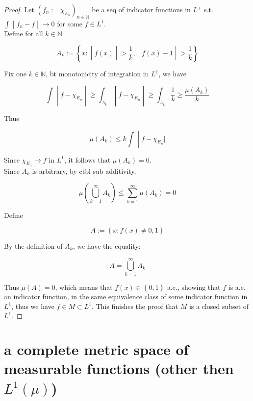 \begin{proof}

Let \((f_{n} := \chi_{E_{n}})_{n \in \mathbb{N}}\) be a seq of indicator functions in \(L^{+}\) s.t. \(\left. \int \middle| f_{n} - f \middle| \rightarrow 0 \right.\) for some \(f \in L^{1}\).\\
Define for all \(k \in \mathbb{N}\)

\[A_{k} := \left\{ x: \middle| f(x) \middle| > \frac{1}{k}, \middle| f(x) - 1 \middle| > \frac{1}{k} \right\}\]

Fix one \(k \in \mathbb{N}\), bt monotonicity of integration in \(L^{1}\), we have

\[\left. \int \middle| f - \chi_{E_{n}} \middle| \geq \int_{A_{k}} \middle| f - \chi_{E_{n}} \middle| \geq \int_{A_{k}}\frac{1}{k} \geq \frac{\mu(A_{k})}{k} \right.\]

Thus

\[\left. \mu(A_{k}) \leq k\int \middle| f - \chi_{E_{n}}| \right.\]

Since \(\chi_{E_{n}}\rightarrow f\) in \(L^{1}\), it follows that \(\mu(A_{k}) = 0\).\\
Since \(A_{k}\) is arbitrary, by ctbl sub additivity,

\[\mu(\bigcup\limits_{k = 1}^{\infty}A_{k}) \leq \sum\limits_{k = 1}^{\infty}\mu(A_{k}) = 0\]

Define

\[A := \left\{ {x:f(x) \neq 0,1} \right\}\]

By the definition of \(A_{k}\), we have the equality:

\[A = \bigcup\limits_{k = 1}^{\infty}A_{k}\]

Thus \(\mu(A) = 0\), which means that \(f(x) \in \left\{ {0,1} \right\}\) a.e., showing that \(f\) is a.e. an indicator function, in the same equivalence class of some indicator function in \(L^{1}\), thus we have \(f \in M \subset L^{1}\). This finishes the proof that \(M\) is a closed subset of \(L^{1}\).

\end{proof}

\section{\texorpdfstring{a complete metric space of measurable functions (other then \(L^{1}(\mu)\))}{a complete metric space of measurable functions (other then L\^{}\{1\}(\textbackslash mu))}}\label{a-complete-metric-space-of-measurable-functions-other-then-l1mu}

